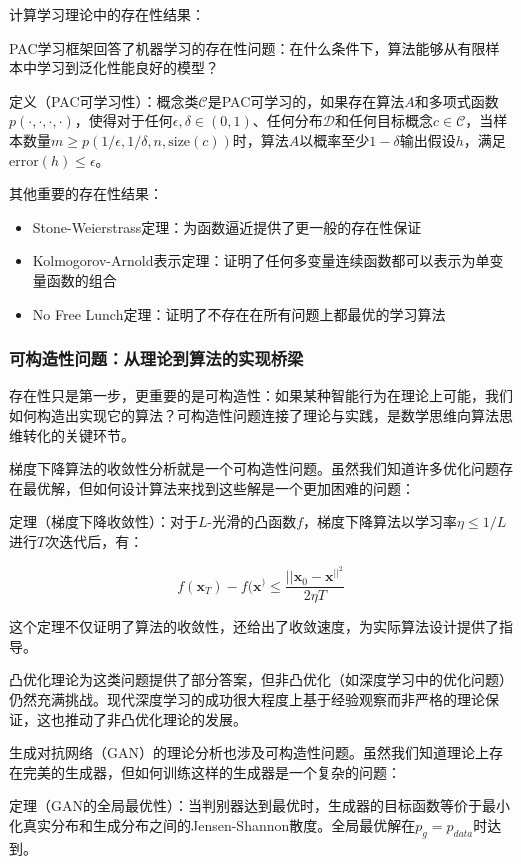计算学习理论中的存在性结果：

PAC学习框架回答了机器学习的存在性问题：在什么条件下，算法能够从有限样本中学习到泛化性能良好的模型？

定义（PAC可学习性）：概念类$\mathcal{C}$是PAC可学习的，如果存在算法$A$和多项式函数$p(\cdot, \cdot, \cdot, \cdot)$，使得对于任何$\epsilon, \delta \in (0,1)$、任何分布$\mathcal{D}$和任何目标概念$c \in \mathcal{C}$，当样本数量$m \geq p(1/\epsilon, 1/\delta, n, \text{size}(c))$时，算法$A$以概率至少$1-\delta$输出假设$h$，满足$\text{error}(h) \leq \epsilon$。

其他重要的存在性结果：

\begin{itemize}
\item Stone-Weierstrass定理：为函数逼近提供了更一般的存在性保证
\item Kolmogorov-Arnold表示定理：证明了任何多变量连续函数都可以表示为单变量函数的组合
\item No Free Lunch定理：证明了不存在在所有问题上都最优的学习算法
\end{itemize}

\subsubsection{可构造性问题：从理论到算法的实现桥梁}

存在性只是第一步，更重要的是可构造性：如果某种智能行为在理论上可能，我们如何构造出实现它的算法？可构造性问题连接了理论与实践，是数学思维向算法思维转化的关键环节。

梯度下降算法的收敛性分析就是一个可构造性问题。虽然我们知道许多优化问题存在最优解，但如何设计算法来找到这些解是一个更加困难的问题：

定理（梯度下降收敛性）：对于$L$-光滑的凸函数$f$，梯度下降算法以学习率$\eta \leq 1/L$进行$T$次迭代后，有：

$$f(\mathbf{x}_T) - f(\mathbf{x}^) \leq \frac{||\mathbf{x}_0 - \mathbf{x}^||^2}{2\eta T}$$

这个定理不仅证明了算法的收敛性，还给出了收敛速度，为实际算法设计提供了指导。

凸优化理论为这类问题提供了部分答案，但非凸优化（如深度学习中的优化问题）仍然充满挑战。现代深度学习的成功很大程度上基于经验观察而非严格的理论保证，这也推动了非凸优化理论的发展。

生成对抗网络（GAN）的理论分析也涉及可构造性问题。虽然我们知道理论上存在完美的生成器，但如何训练这样的生成器是一个复杂的问题：

定理（GAN的全局最优性）：当判别器达到最优时，生成器的目标函数等价于最小化真实分布和生成分布之间的Jensen-Shannon散度。全局最优解在$p_g = p_{data}$时达到。


